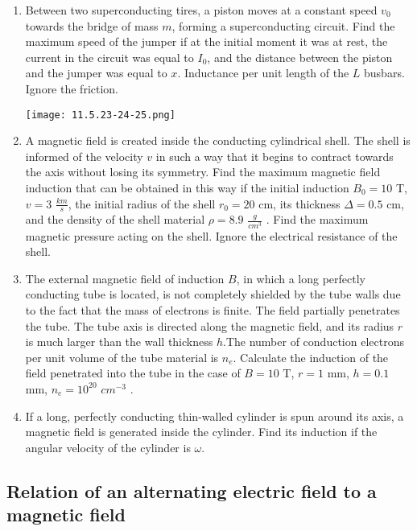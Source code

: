 \documentclass{article}
\begin{document}
\begin{enumerate}[label=11.5.\arabic*]
\item Between two superconducting tires, a piston moves at a constant speed $v_0$ towards the bridge of mass $m$, forming a superconducting circuit. Find the maximum speed of the jumper if at the initial moment it was at rest, the current in the circuit was equal to $I_0$, and the distance between the piston and the jumper was equal to $x$. Inductance per unit length of the $L$ busbars. Ignore the friction.

\begin{center}
    \texttt{[image: 11.5.23-24-25.png]}
\end{center}


\item A magnetic field is created inside the conducting cylindrical shell. The shell is informed of the velocity $v$ in such a way that it begins to contract towards the axis without losing its symmetry. Find the maximum magnetic field induction that can be obtained in this way if the initial induction $B_0 = 10$ T, $v = 3$ $\frac{km}{s}$, the initial radius of the shell $r_0 = 20$ cm, its thickness $\Delta = 0.5$ cm, and the density of the shell material $\rho = 8.9$ $\frac{g}{cm^3}$ . Find the maximum magnetic pressure acting on the shell. Ignore the electrical resistance of the shell.

\item The external magnetic field of induction $B$, in which a long perfectly conducting tube is located, is not completely shielded by the tube walls due to the fact that the mass of electrons is finite. The field partially penetrates the tube. The tube axis is directed along the magnetic field, and its radius $r$ is much larger than the wall thickness $h$.The number of conduction electrons per unit volume of the tube material is $n_e$. Calculate the induction of the field penetrated into the tube in the case of $B = 10$ T, $r = 1$ mm, $h = 0.1$ mm, $n_e = 10^{20}$ $cm^{-3}$ .

\item If a long, perfectly conducting thin-walled cylinder is spun around its axis, a magnetic field is generated inside the cylinder. Find its induction if the angular velocity of the cylinder is $\omega$.


\end{enumerate}


\subsection{Relation of an alternating electric field to a magnetic field}
\end{document}
